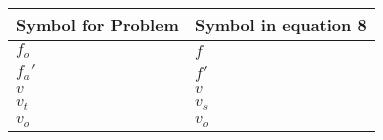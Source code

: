 \begin{tabular}{ | m{3.3cm} | m{3.5cm} | }
  \hline
 \textbf{Symbol for Problem} & \textbf{ Symbol in equation 8}  \\
 \hline
 $f_o$ & $f$\\
\hline
$f_a'$ & $f'$\\
\hline
 $v$ & $v$\\
\hline
$v_t$ & $v_s$  \\
\hline
$v_o$ & $v_o$ \\
\hline
\end{tabular}